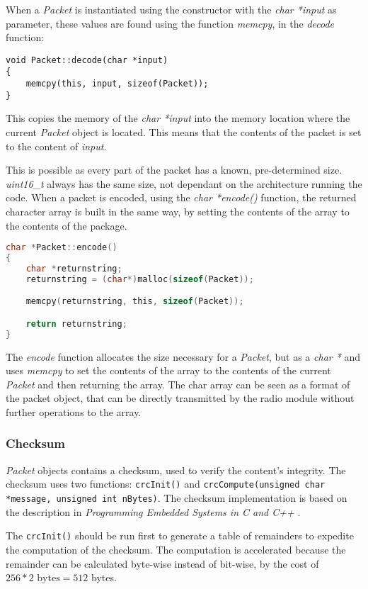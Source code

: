 When a \textit{Packet} is instantiated using the constructor with the \textit{char *input} as parameter, these values are found using the function \textit{memcpy}, in the \textit{decode} function:
\begin{lstlisting}
void Packet::decode(char *input)
{
    memcpy(this, input, sizeof(Packet));
}
\end{lstlisting}
This copies the memory of the \textit{char *input} into the memory location where the current \textit{Packet} object is located. This means that the contents of the packet is set to the content of \textit{input}.

This is possible as every part of the packet has a known, pre-determined size. \textit{uint16\_t} always has the same size, not dependant on the architecture running the code. When a packet is encoded, using the \textit{char *encode()} function, the returned character array is built in the same way, by setting the contents of the array to the contents of the package.

\begin{lstlisting}[language=C]
char *Packet::encode()
{
    char *returnstring;
    returnstring = (char*)malloc(sizeof(Packet));

    memcpy(returnstring, this, sizeof(Packet));

    return returnstring;
}
\end{lstlisting}
The \textit{encode} function allocates the size necessary for a \textit{Packet}, but as a \textit{char *} and uses \textit{memcpy} to set the contents of the array to the contents of the current \textit{Packet} and then returning the array. The char array can be seen as a format of the packet object, that can be directly transmitted by the radio module without further operations to the array.

\subsubsection{Checksum}
\textit{Packet} objects contains a checksum, used to verify the content's integrity.  The checksum uses two functions: \texttt{crcInit()} and \texttt{crcCompute(unsigned char *message, unsigned int nBytes)}. The checksum implementation is based on the description in \textit{Programming Embedded Systems in C and C++} \cite{crcCode}.

The \texttt{crcInit()} should be run first to generate a table of remainders to expedite the computation of the checksum. The computation is accelerated because the remainder can be calculated byte-wise instead of bit-wise, by the cost of $256 * 2 \text{ bytes} = 512$ bytes. 

